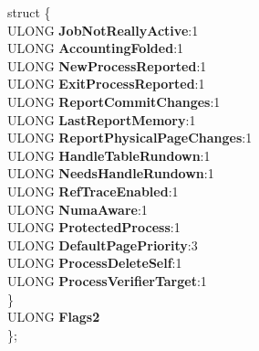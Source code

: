 \begin{DoxyCompactItemize}
\begin{tabbing}
\>struct \{\\
\>\>ULONG {\bfseries JobNotReallyActive}:1\\
\>\>ULONG {\bfseries AccountingFolded}:1\\
\>\>ULONG {\bfseries NewProcessReported}:1\\
\>\>ULONG {\bfseries ExitProcessReported}:1\\
\>\>ULONG {\bfseries ReportCommitChanges}:1\\
\>\>ULONG {\bfseries LastReportMemory}:1\\
\>\>ULONG {\bfseries ReportPhysicalPageChanges}:1\\
\>\>ULONG {\bfseries HandleTableRundown}:1\\
\>\>ULONG {\bfseries NeedsHandleRundown}:1\\
\>\>ULONG {\bfseries RefTraceEnabled}:1\\
\>\>ULONG {\bfseries NumaAware}:1\\
\>\>ULONG {\bfseries ProtectedProcess}:1\\
\>\>ULONG {\bfseries DefaultPagePriority}:3\\
\>\>ULONG {\bfseries ProcessDeleteSelf}:1\\
\>\>ULONG {\bfseries ProcessVerifierTarget}:1\\
\>\} \\
\>ULONG {\bfseries Flags2}\\
\}; \\


\end{tabbing}
\end{DoxyCompactItemize}
